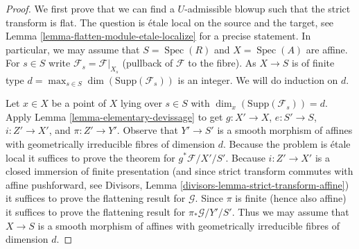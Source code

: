 \documentclass{amsart}
\theoremstyle{plain}
\theoremstyle{definition}
\theoremstyle{remark}
\numberwithin{equation}{subsection}
\def\Spec{\mathop{\mathrm{Spec}}}
\begin{document}
\begin{proof}
We first prove that we can find a $U$-admissible blowup such that the
strict transform is flat. The question is \'etale local on the source
and the target, see
Lemma \ref{lemma-flatten-module-etale-localize} for a precise statement.
In particular, we may assume that $S = \Spec(R)$ and $X = \Spec(A)$
are affine. For $s \in S$ write $\mathcal{F}_s = \mathcal{F}|_{X_s}$
(pullback of $\mathcal{F}$ to the fibre). As $X \to S$ is of finite type
$d = \max_{s \in S} \dim(\text{Supp}(\mathcal{F}_s))$
is an integer. We will do induction on $d$.

\medskip\noindent
Let $x \in X$ be a point of $X$ lying over $s \in S$ with
$\dim_x(\text{Supp}(\mathcal{F}_s)) = d$.
Apply Lemma \ref{lemma-elementary-devissage} to get
$g : X' \to X$, $e : S' \to S$, $i : Z' \to X'$, and $\pi : Z' \to Y'$.
Observe that $Y' \to S'$ is
a smooth morphism of affines with geometrically irreducible fibres
of dimension $d$. Because the problem is \'etale local it suffices
to prove the theorem for $g^*\mathcal{F}/X'/S'$. Because $i : Z' \to X'$
is a closed immersion of finite presentation (and since strict transform
commutes with affine pushforward, see
Divisors, Lemma \ref{divisors-lemma-strict-transform-affine})
it suffices to prove the flattening result for $\mathcal{G}$.
Since $\pi$ is finite (hence also affine) it suffices to prove the
flattening result for $\pi_*\mathcal{G}/Y'/S'$. Thus we may assume
that $X \to S$ is a smooth morphism of affines with geometrically
irreducible fibres of dimension $d$.


\end{proof}
\end{document}
